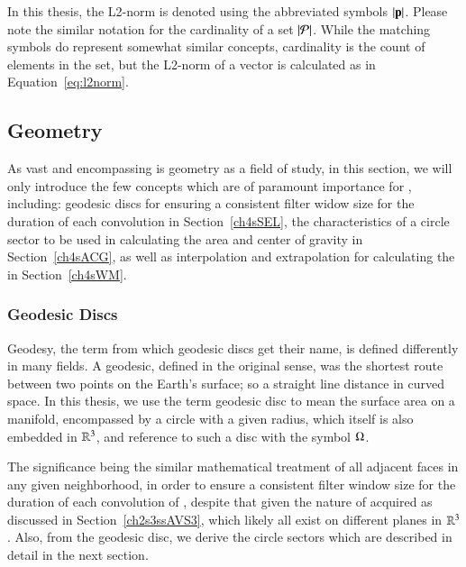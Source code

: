 In this thesis, the L2-norm is denoted using the abbreviated symbols $|\mathbf{p}|$. Please note the similar notation for the cardinality of a set $|\mathcal{P}|$. While the matching symbols do represent somewhat similar concepts, cardinality is the count of elements in the set, but the L2-norm of a vector is calculated as in Equation~\ref{eq:l2norm}.~\cite[p.~26]{Mara12}

%
%
%
%
\subsection{Geometry}
\label{ch2sETBssG}
As vast and encompassing is geometry as a field of study, in this section, we will only introduce the few concepts which are of paramount importance for , including: geodesic discs for ensuring a consistent filter widow size for the duration of each convolution in Section~\ref{ch4sSEL}, the characteristics of a circle sector to be used in calculating the area and center of gravity in Section~\ref{ch4sACG}, as well as interpolation and extrapolation for calculating the  in Section~\ref{ch4sWM}.

%
%
\subsubsection{Geodesic Discs}
\label{ch2sETBssGsssGD}
Geodesy, the term from which geodesic discs get their name, is defined differently in many fields. A geodesic, defined in the original sense, was the shortest route between two points on the Earth's surface; so a straight line distance in curved space. In this thesis, we use the term geodesic disc to mean the surface area on a manifold, encompassed by a circle with a given radius, which itself is also embedded in $\mathbb{R}^{3}$, and reference to such a disc with the symbol $\Omega$.

The significance being the similar mathematical treatment of all adjacent faces in any given neighborhood, in order to ensure a consistent filter window size for the duration of each convolution of , despite that given the nature of acquired \tdd{} as discussed in Section~\ref{ch2s3ssAVS3}, which likely all exist on different planes in $\mathbb{R}^{3}$. Also, from the geodesic disc, we derive the circle sectors which are described in detail in the next section.
%
%

